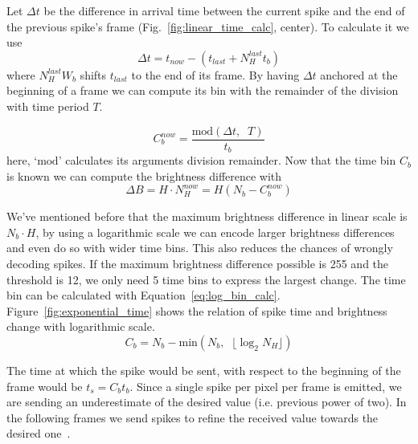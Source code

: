 \documentclass[conference]{IEEEtran}
\begin{document}
Let $\Delta t$ be the difference in arrival time between the current spike and the end of the previous spike's frame (Fig.~\ref{fig:linear_time_calc}, center). To calculate it we use
\begin{equation}
\Delta t = t_{now} -  \left(t_{last} + N_{H}^{last}t_{b}\right)
\label{eq:time_diff}
\end{equation}
where $N_{H}^{last}W_{b}$ shifts $t_{last}$ to the end of its frame. By having $\Delta t$ anchored at the beginning of a frame we can compute its bin with the remainder of the division with time period $T$.

\begin{equation}
C^{now}_{b} = \frac{ \mathrm{mod}\left(\Delta t, \;\; T\right) }{ t_{b} }
\label{eq:bin_compute}
\end{equation}
here, `$\mathrm{mod}$' calculates its arguments division remainder. Now that the time bin $C_{b}$ is known we can compute the brightness difference with
\begin{equation}
 \Delta B = H\cdot N_{H}^{now} =  H\left(N_{b} - C^{now}_{b}\right) 
 \label{eq:new_Nh_linear}
\end{equation}

We've mentioned before that the maximum brightness difference in linear scale is $N_{b}\cdot H$, by using a logarithmic scale we can encode larger brightness differences and even do so with wider time bins. This also reduces the chances of wrongly decoding spikes. If the maximum brightness difference possible is 255 and the threshold is 12, we only need 5 time bins to express the largest change. 
The time bin can be calculated with Equation~\ref{eq:log_bin_calc}. Figure~\ref{fig:exponential_time} shows the relation of spike time and brightness change with logarithmic scale.
\begin{equation}
\label{eq:log_bin_calc}
C_{b} = N_{b} - \mathrm{min}\left( N_{b}, \;\; \lfloor\log_{2} N_{H}\rfloor \right) 
\end{equation}

The time at which the spike would be sent, with respect to the beginning of the frame would be $t_{s} = C_{b}t_{b}$.
Since a single spike per pixel per frame is emitted, we are sending an underestimate of the desired value (i.e. previous power of two). In the following frames we send spikes to refine the received value towards the desired one~\cite{sardac}. 
\end{document}
